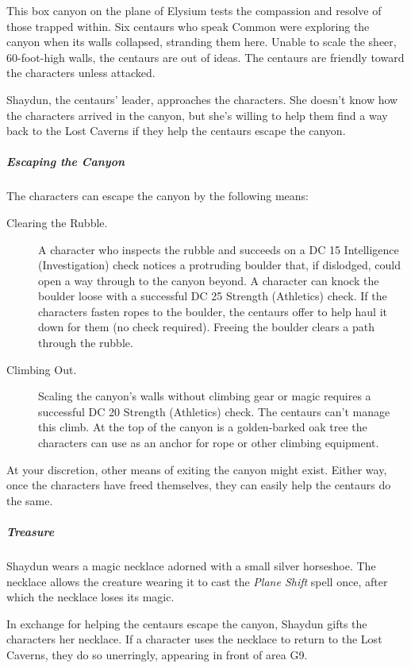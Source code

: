 \documentclass[10pt,a4paper,twoside,bg=print,twocolumn,openany,nodeprecatedcode]{dndbook}
\begin{document}
This box canyon on the plane of Elysium tests the compassion and resolve of those trapped within. Six centaurs who speak Common were exploring the canyon when its walls collapsed, stranding them here. Unable to scale the sheer, 60-foot-high walls, the centaurs are out of ideas. The centaurs are friendly toward the characters unless attacked.

Shaydun, the centaurs' leader, approaches the characters. She doesn't know how the characters arrived in the canyon, but she's willing to help them find a way back to the Lost Caverns if they help the centaurs escape the canyon.

\subparagraph{Escaping the Canyon}
The characters can escape the canyon by the following means:


\begin{description}
\item[Clearing the Rubble.]
A character who inspects the rubble and succeeds on a DC 15 Intelligence (Investigation) check notices a protruding boulder that, if dislodged, could open a way through to the canyon beyond. A character can knock the boulder loose with a successful DC 25 Strength (Athletics) check. If the characters fasten ropes to the boulder, the centaurs offer to help haul it down for them (no check required). Freeing the boulder clears a path through the rubble.
\item[Climbing Out.]
Scaling the canyon's walls without climbing gear or magic requires a successful DC 20 Strength (Athletics) check. The centaurs can't manage this climb. At the top of the canyon is a golden-barked oak tree the characters can use as an anchor for rope or other climbing equipment.
\end{description}

At your discretion, other means of exiting the canyon might exist. Either way, once the characters have freed themselves, they can easily help the centaurs do the same.

\subparagraph{Treasure}
Shaydun wears a magic necklace adorned with a small silver horseshoe. The necklace allows the creature wearing it to cast the \textit{Plane Shift} spell once, after which the necklace loses its magic.

In exchange for helping the centaurs escape the canyon, Shaydun gifts the characters her necklace. If a character uses the necklace to return to the Lost Caverns, they do so unerringly, appearing in front of area G9.
\end{document}
